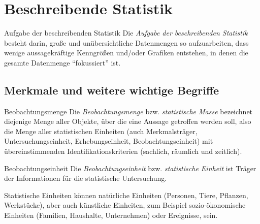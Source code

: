 \section{Beschreibende Statistik}

\begin{bonus}{Aufgabe der beschreibenden Statistik}
    Die \emph{Aufgabe der beschreibenden Statistik} besteht darin, große und unübersichtliche Datenmengen so aufzuarbeiten, dass wenige aussagekräftige Kenngrößen und/oder Grafiken entstehen, in denen die gesamte Datenmenge \enquote{fokussiert} ist.
\end{bonus}

\subsection{Merkmale und weitere wichtige Begriffe}

\begin{defi}{Beobachtungsmenge}
    Die \emph{Beobachtungsmenge} bzw. \emph{statistische Masse} bezeichnet diejenige Menge aller Objekte, über die eine Aussage getroffen werden soll, also die Menge aller statistischen Einheiten (auch Merkmalsträger, Untersuchungseinheit, Erhebungseinheit, Beobachtungseinheit) mit übereinstimmenden Identifikationskriterien (sachlich, räumlich und zeitlich).
\end{defi}

\begin{defi}{Beobachtungseinheit}
    Die \emph{Beobachtungseinheit} bzw. \emph{statistische Einheit} ist Träger der Informationen für die statistische Untersuchung.

    Statistische Einheiten können natürliche Einheiten (Personen, Tiere, Pflanzen, Werkstücke), aber auch künstliche Einheiten, zum Beispiel sozio-ökonomische Einheiten (Familien, Haushalte, Unternehmen) oder Ereignisse, sein.
\end{defi}

